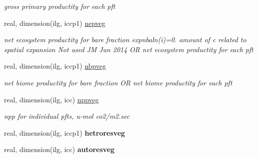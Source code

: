 \begin{DoxyCompactItemize}
\begin{DoxyCompactList}\small\item\em gross primary productity for each pft \end{DoxyCompactList}\item 
\hypertarget{structctem__statevars_1_1veg__gat_afca62bde55e84abec322cece5c965fb7}{}real, dimension(ilg, iccp1) \hyperlink{structctem__statevars_1_1veg__gat_afca62bde55e84abec322cece5c965fb7}{nepveg}\label{structctem__statevars_1_1veg__gat_afca62bde55e84abec322cece5c965fb7}

\begin{DoxyCompactList}\small\item\em net ecosystem productity for bare fraction expnbaln(i)=0. amount of c related to spatial expansion Not used J\+M Jun 2014 O\+R net ecosystem productity for each pft \end{DoxyCompactList}\item 
\hypertarget{structctem__statevars_1_1veg__gat_a7d3b547d72b26a9e5c89cb64262ea269}{}real, dimension(ilg, iccp1) \hyperlink{structctem__statevars_1_1veg__gat_a7d3b547d72b26a9e5c89cb64262ea269}{nbpveg}\label{structctem__statevars_1_1veg__gat_a7d3b547d72b26a9e5c89cb64262ea269}

\begin{DoxyCompactList}\small\item\em net biome productity for bare fraction O\+R net biome productity for each pft \end{DoxyCompactList}\item 
\hypertarget{structctem__statevars_1_1veg__gat_aa61a73dccf247c53360e423c89d884c4}{}real, dimension(ilg, icc) \hyperlink{structctem__statevars_1_1veg__gat_aa61a73dccf247c53360e423c89d884c4}{nppveg}\label{structctem__statevars_1_1veg__gat_aa61a73dccf247c53360e423c89d884c4}

\begin{DoxyCompactList}\small\item\em npp for individual pfts, u-\/mol co2/m2.\+sec \end{DoxyCompactList}\item 
\hypertarget{structctem__statevars_1_1veg__gat_a2921670a3d2139eec90824225856000d}{}real, dimension(ilg, iccp1) {\bfseries hetroresveg}\label{structctem__statevars_1_1veg__gat_a2921670a3d2139eec90824225856000d}

\item 
\hypertarget{structctem__statevars_1_1veg__gat_ab30220c0ecad7c78f7224b6835a7a0e1}{}real, dimension(ilg, icc) {\bfseries autoresveg}\label{structctem__statevars_1_1veg__gat_ab30220c0ecad7c78f7224b6835a7a0e1}


\end{DoxyCompactItemize}
